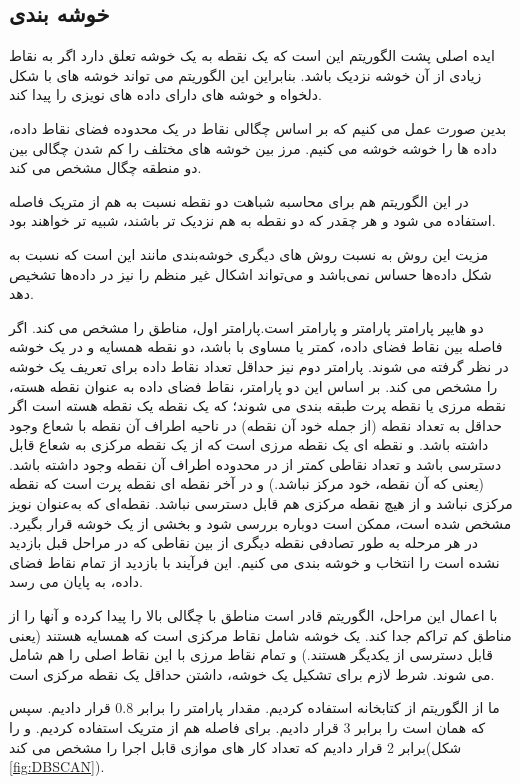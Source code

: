 \documentclass[12pt,onecolumn,a4paper]{article}
\begin{document}
\subsection{خوشه بندی }
ایده اصلی پشت الگوریتم  این است که یک نقطه به یک خوشه تعلق دارد اگر به نقاط زیادی از آن خوشه نزدیک باشد. بنابراین این الگوریتم می تواند خوشه های با شکل دلخواه و خوشه های دارای داده های نویزی را پیدا کند. 

بدین صورت عمل می کنیم که بر اساس چگالی نقاط در یک محدوده فضای نقاط داده، داده ها را خوشه خوشه می کنیم. مرز بین خوشه های مختلف را کم شدن چگالی بین دو منطقه چگال مشخص می کند.

در این الگوریتم هم برای محاسبه شباهت دو نقطه نسبت به هم از متریک فاصله استفاده می شود و هر چقدر که دو نقطه به هم نزدیک تر باشند، شبیه تر خواهند بود.

مزیت این روش به نسبت روش‌ های دیگری خوشه‌بندی مانند  این است که نسبت به شکل داده‌ها حساس نمی‌باشد و می‌تواند اشکال غیر منظم را نیز در داده‌ها تشخیص دهد.

دو هایپر پارامتر  پارامتر  و پارامتر  است.پارامتر اول، مناطق را مشخص می کند. اگر فاصله بین نقاط فضای داده، کمتر یا مساوی با  باشد، دو نقطه همسایه و در یک خوشه در نظر گرفته می شوند. پارامتر دوم نیز حداقل تعداد نقاط داده برای تعریف یک خوشه را مشخص می کند. بر اساس این دو پارامتر، نقاط فضای داده به عنوان نقطه هسته، نقطه مرزی یا نقطه پرت طبقه بندی می شوند؛ که یک نقطه یک نقطه هسته است اگر حداقل به تعداد  نقطه (از جمله خود آن نقطه) در ناحیه اطراف آن نقطه با شعاع  وجود داشته باشد. و نقطه ای یک نقطه مرزی است که از یک نقطه مرکزی به شعاع  قابل دسترسی باشد و تعداد نقاطی کمتر از  در محدوده اطراف آن نقطه وجود داشته باشد. (یعنی که آن نقطه، خود مرکز نباشد.) و در آخر نقطه ای نقطه پرت است که نقطه مرکزی نباشد و از هیچ نقطه مرکزی هم قابل دسترسی نباشد. نقطه‌ای که به‌عنوان نویز مشخص شده است، ممکن است دوباره بررسی شود و بخشی از یک خوشه قرار بگیرد. در هر مرحله به طور تصادفی نقطه دیگری از بین نقاطی که در مراحل قبل بازدید نشده است را انتخاب و خوشه بندی می کنیم. این فرآیند با بازدید از تمام نقاط فضای داده، به پایان می رسد.

با اعمال این مراحل، الگوریتم  قادر است مناطق با چگالی بالا را پیدا کرده و آنها را از مناطق کم تراکم جدا کند. یک خوشه شامل نقاط مرکزی است که همسایه هستند (یعنی قابل دسترسی از یکدیگر هستند.) و تمام نقاط مرزی با این نقاط اصلی را هم شامل می شوند. شرط لازم برای تشکیل یک خوشه، داشتن حداقل یک نقطه مرکزی است.

ما از الگوریتم  از کتابخانه  استفاده کردیم. مقدار پارامتر  را برابر 0.8 قرار دادیم. سپس  که همان  است را برابر 3 قرار دادیم. برای فاصله هم از متریک  استفاده کردیم. و  را برابر 2 قرار دادیم که تعداد کار های موازی قابل اجرا را مشخص می کند(شکل \ref{fig:DBSCAN}).
\end{document}

